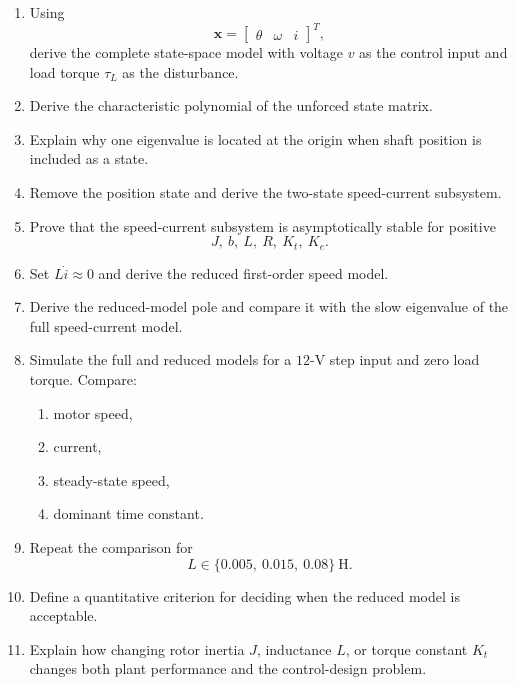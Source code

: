 \begin{enumerate}
    \item Using
    \begin{equation}
    \mathbf{x}
    =
    \begin{bmatrix}
    \theta&\omega&i
    \end{bmatrix}^{T},
    \end{equation}
    derive the complete state-space model with voltage $v$ as the control
    input and load torque $\tau_L$ as the disturbance.

    \item Derive the characteristic polynomial of the unforced state matrix.

    \item Explain why one eigenvalue is located at the origin when shaft
    position is included as a state.

    \item Remove the position state and derive the two-state speed-current
    subsystem.

    \item Prove that the speed-current subsystem is asymptotically stable for
    positive
    \begin{equation}
    J,\ b,\ L,\ R,\ K_t,\ K_e.
    \end{equation}

    \item Set $L\dot{i}\approx0$ and derive the reduced first-order speed
    model.

    \item Derive the reduced-model pole and compare it with the slow
    eigenvalue of the full speed-current model.

    \item Simulate the full and reduced models for a $12$-V step input and
    zero load torque. Compare:
    \begin{enumerate}
        \item motor speed,
        \item current,
        \item steady-state speed,
        \item dominant time constant.
    \end{enumerate}

    \item Repeat the comparison for
    \begin{equation}
    L\in\{0.005,\ 0.015,\ 0.08\}~\mathrm{H}.
    \end{equation}

    \item Define a quantitative criterion for deciding when the reduced model
    is acceptable.

    \item Explain how changing rotor inertia $J$, inductance $L$, or torque
    constant $K_t$ changes both plant performance and the control-design
    problem.
\end{enumerate}


